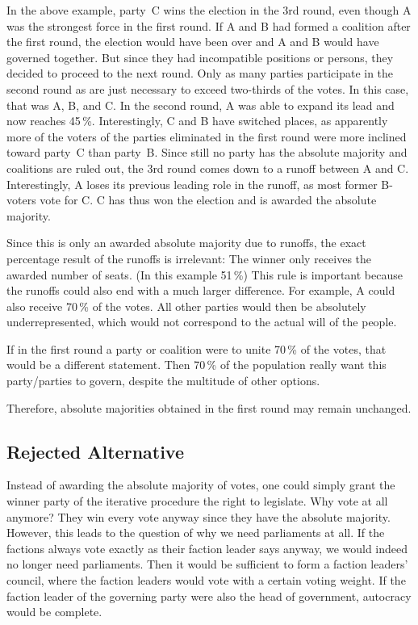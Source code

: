 \bigskip

In the above example, party~C wins the election in the 3rd round, even though A was the
strongest force in the first round. If A and B had formed a coalition after the first round,
the election would have been over and A and B would have governed together. But since they had incompatible
positions or persons, they decided to proceed to the next round.
Only as many parties participate in the second round as are just necessary to exceed two-thirds
of the votes. In this case, that was A, B, and C. In the second round, A
was able to expand its lead and now reaches 45\,\%. Interestingly, C and B have
switched places, as apparently more of the voters of the parties eliminated in the first round
were more inclined toward party~C than party~B.
Since still no party has the absolute majority and coalitions are ruled out,
the 3rd round comes down to a runoff between A and C. Interestingly, A loses its
previous leading role in the runoff, as most former B-voters vote for C. C has
thus won the election and is awarded the absolute majority.

Since this is only an
awarded absolute majority due to runoffs, the exact percentage
result of the runoffs is irrelevant: The winner only receives the awarded number of seats. (In
this example 51\,\%) This rule is important because the runoffs could also end with
a much larger difference. For example, A could also receive 70\,\% of the votes.
All other parties would then be absolutely underrepresented, which would not correspond to the actual
will of the people.

If in the first round a party or coalition were to unite 70\,\% of the votes,
that would be a different statement. Then 70\,\% of the population really want
this party/parties to govern, despite the multitude of other options.

Therefore, absolute majorities obtained in the first round may remain unchanged.

\subsection{Rejected Alternative}

Instead of awarding the absolute majority of votes, one could simply grant the
winner party of the iterative procedure the right to legislate. Why vote at all
anymore? They win every vote anyway since they have the absolute majority.
However, this leads to the question of why we need parliaments at all. If the factions always
vote exactly as their faction leader says anyway, we would indeed no longer need
parliaments. Then it would be sufficient to form a faction leaders' council, where the
faction leaders would vote with a certain voting weight. If the
faction leader of the governing party were also the head of government,
autocracy would be complete.

